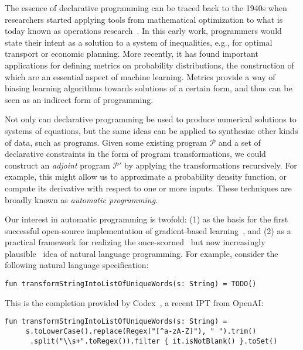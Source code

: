 \documentclass[12pt]{article}
\begin{document}
The essence of declarative programming can be traced back to the 1940s when researchers started applying tools from mathematical optimization to what is today known as operations research~\cite{kantorovich1960mathematical}. In this early work, programmers would state their intent as a solution to a system of inequalities, e.g., for optimal transport or economic planning. More recently, it has found important applications for defining metrics on probability distributions, the construction of which are an essential aspect of machine learning. Metrics provide a way of biasing learning algorithms towards solutions of a certain form, and thus can be seen as an indirect form of programming.

Not only can declarative programming be used to produce numerical solutions to systems of equations, but the same ideas can be applied to synthesize other kinds of data, such as programs. Given some existing program $\mathcal P$ and a set of declarative constraints in the form of program transformations, we could construct an \textit{adjoint} program $\mathcal P'$ by applying the transformations recursively. For example, this might allow us to approximate a probability density function, or compute its derivative with respect to one or more inputs. These techniques are broadly known as \textit{automatic programming}.

Our interest in automatic programming is twofold: (1) as the basis for the first successful open-source implementation of gradient-based learning~\cite{baydin2018automatic}, and (2) as a practical framework for realizing the once-scorned~\cite{dijkstra1979foolishness} but now increasingly plausible~\cite{chen2021evaluating} idea of natural language programming. For example, consider the following natural language specification:

\begin{lstlisting}[basicstyle=\footnotesize\ttfamily]
  fun transformStringIntoListOfUniqueWords(s: String) = TODO()
\end{lstlisting}

\noindent This is the completion provided by Codex~\cite{chen2021evaluating}, a recent IPT from OpenAI:

\begin{lstlisting}[basicstyle=\footnotesize\ttfamily]
  fun transformStringIntoListOfUniqueWords(s: String) =
     s.toLowerCase().replace(Regex("[^a-zA-Z]"), " ").trim()
      .split("\\s+".toRegex()).filter { it.isNotBlank() }.toSet()
\end{lstlisting}
\end{document}
